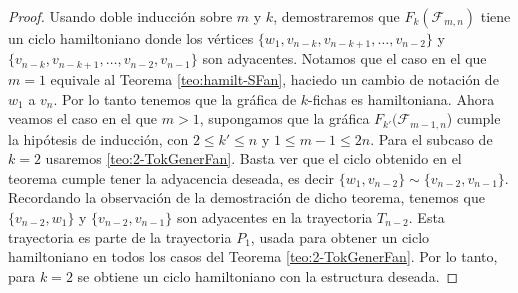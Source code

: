 \begin{proof}
    Usando doble inducci\'on sobre $m$ y $k$, demostraremos que
    $F_k(\mathcal{F}_{m,n})$ tiene un ciclo hamiltoniano donde los v\'ertices $\{w_1,
    v_{n-k}, v_{n-k+1}, \dots, v_{n-2}\}$ y $\{v_{n-k}, v_{n-k+1}, \dots,
    v_{n-2}, v_{n-1}\}$ son adyacentes. Notamos que el caso en el que $m =1$
    equivale al Teorema \ref{teo:hamilt-SFan}, haciedo un cambio de
    notaci\'on de $w_1$ a $v_n$. Por lo tanto tenemos que la gr\'afica de
    $k$-fichas es hamiltoniana. Ahora veamos el caso en el que $m>1$,
    supongamos que la gr\'afica $F_{k'}(\mathcal{F}_{m-1,n}$) cumple la hip\'otesis de
    inducci\'on, con $2\leq k'\leq n$ y $1 \leq m-1 \leq 2n$. Para el subcaso de
    $k=2$ usaremos \cref{teo:2-TokGenerFan}. Basta ver que el ciclo
    obtenido en el teorema cumple tener la adyacencia deseada, es decir
    $\{w_1, v_{n-2}\}\sim\{v_{n-2}, v_{n-1}\}$. Recordando la observaci\'on
    de la demostraci\'on de dicho teorema, tenemos que $\{v_{n-2},w_1\}$ y
    $\{v_{n-2},v_{n-1}\}$ son adyacentes en la trayectoria $T_{n-2}$. Esta
    trayectoria es parte de la trayectoria $P_1$, usada para obtener un
    ciclo hamiltoniano en todos los casos del Teorema
    \ref{teo:2-TokGenerFan}. Por lo tanto, para $k=2$ se obtiene un ciclo
    hamiltoniano con la estructura deseada.


\end{proof}
